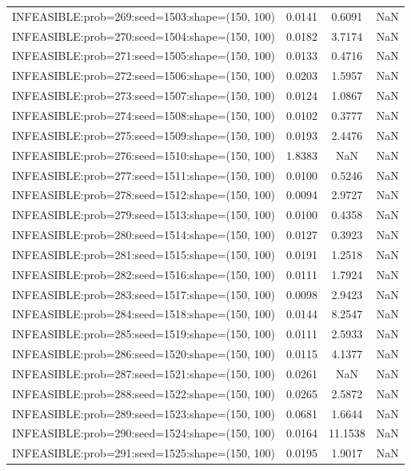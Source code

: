 \begin{longtable}{lccc}
INFEASIBLE:prob=269:seed=1503:shape=(150, 100) & 0.0141 &  0.6091 &    NaN \\
INFEASIBLE:prob=270:seed=1504:shape=(150, 100) & 0.0182 &  3.7174 &    NaN \\
INFEASIBLE:prob=271:seed=1505:shape=(150, 100) & 0.0133 &  0.4716 &    NaN \\
INFEASIBLE:prob=272:seed=1506:shape=(150, 100) & 0.0203 &  1.5957 &    NaN \\
INFEASIBLE:prob=273:seed=1507:shape=(150, 100) & 0.0124 &  1.0867 &    NaN \\
INFEASIBLE:prob=274:seed=1508:shape=(150, 100) & 0.0102 &  0.3777 &    NaN \\
INFEASIBLE:prob=275:seed=1509:shape=(150, 100) & 0.0193 &  2.4476 &    NaN \\
INFEASIBLE:prob=276:seed=1510:shape=(150, 100) & 1.8383 &     NaN &    NaN \\
INFEASIBLE:prob=277:seed=1511:shape=(150, 100) & 0.0100 &  0.5246 &    NaN \\
INFEASIBLE:prob=278:seed=1512:shape=(150, 100) & 0.0094 &  2.9727 &    NaN \\
INFEASIBLE:prob=279:seed=1513:shape=(150, 100) & 0.0100 &  0.4358 &    NaN \\
INFEASIBLE:prob=280:seed=1514:shape=(150, 100) & 0.0127 &  0.3923 &    NaN \\
INFEASIBLE:prob=281:seed=1515:shape=(150, 100) & 0.0191 &  1.2518 &    NaN \\
INFEASIBLE:prob=282:seed=1516:shape=(150, 100) & 0.0111 &  1.7924 &    NaN \\
INFEASIBLE:prob=283:seed=1517:shape=(150, 100) & 0.0098 &  2.9423 &    NaN \\
INFEASIBLE:prob=284:seed=1518:shape=(150, 100) & 0.0144 &  8.2547 &    NaN \\
INFEASIBLE:prob=285:seed=1519:shape=(150, 100) & 0.0111 &  2.5933 &    NaN \\
INFEASIBLE:prob=286:seed=1520:shape=(150, 100) & 0.0115 &  4.1377 &    NaN \\
INFEASIBLE:prob=287:seed=1521:shape=(150, 100) & 0.0261 &     NaN &    NaN \\
INFEASIBLE:prob=288:seed=1522:shape=(150, 100) & 0.0265 &  2.5872 &    NaN \\
INFEASIBLE:prob=289:seed=1523:shape=(150, 100) & 0.0681 &  1.6644 &    NaN \\
INFEASIBLE:prob=290:seed=1524:shape=(150, 100) & 0.0164 & 11.1538 &    NaN \\
INFEASIBLE:prob=291:seed=1525:shape=(150, 100) & 0.0195 &  1.9017 &    NaN \\

\end{longtable}

